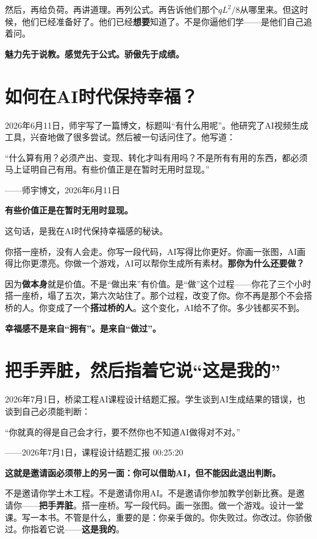 然后，再给负荷。再讲道理。再列公式。再告诉他们那个$qL^2/8$从哪里来。但这时候，他们已经准备好了。他们已经\textbf{想要}知道了。不是你逼他们学——是他们自己追着问。

\textbf{魅力先于说教。感觉先于公式。骄傲先于成绩。}

\section{如何在AI时代保持幸福？}

2026年6月11日，师宇写了一篇博文，标题叫``有什么用呢''。他研究了AI视频生成工具，兴奋地做了很多尝试。然后被一句话问住了。他写道：

\begin{shiyu-inline}
``什么算有用？必须产出、变现、转化才叫有用吗？不是所有有用的东西，都必须马上证明自己有用。有些价值正是在暂时无用时显现。''

\hfill ——师宇博文，2026年6月11日
\end{shiyu-inline}

\textbf{有些价值正是在暂时无用时显现。}

这句话，是我在AI时代保持幸福感的秘诀。

你搭一座桥，没有人会走。你写一段代码，AI写得比你更好。你画一张图，AI画得比你更漂亮。你做一个游戏，AI可以帮你生成所有素材。\textbf{那你为什么还要做？}

因为\textbf{做本身}就是价值。不是``做出来''有价值。是``做''这个过程——你花了三个小时搭一座桥，塌了五次，第六次站住了。那个过程，改变了你。你不再是那个不会搭桥的人。你变成了一个\textbf{搭过桥的人}。这个变化，AI给不了你。多少钱都买不到。

\textbf{幸福感不是来自``拥有''。是来自``做过''。}

\section{把手弄脏，然后指着它说``这是我的''}

2026年7月1日，桥梁工程AI课程设计结题汇报。学生谈到AI生成结果的错误，也谈到自己必须能判断：

\begin{shiyu-inline}
``你就真的得是自己会才行，要不然你也不知道AI做得对不对。''

\hfill ——2026年7月1日，课程设计结题汇报 00:25:20
\end{shiyu-inline}

\textbf{这就是邀请函必须带上的另一面：你可以借助AI，但不能因此退出判断。}

不是邀请你学土木工程。不是邀请你用AI。不是邀请你参加教学创新比赛。是邀请你——\textbf{把手弄脏}。搭一座桥。写一段代码。画一张图。做一个游戏。设计一堂课。写一本书。不管是什么，重要的是：你亲手做的。你失败过。你改过。你骄傲过。你指着它说——\textbf{这是我的}。

